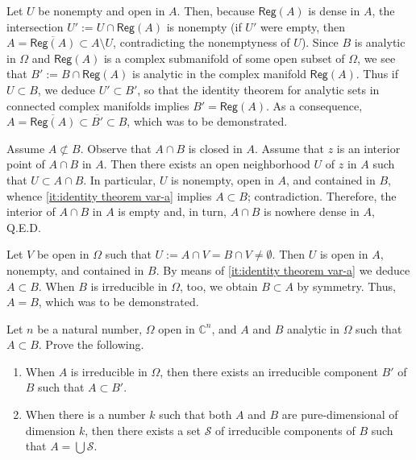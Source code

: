 \documentclass[a4paper]{amsart}
\newcommand{\C}{\mathbb{C}}
\newcommand{\Reg}[1]{\mathsf{Reg}(#1)}
\theoremstyle{remark}
\numberwithin{equation}{question}
\begin{document}
\begin{solution}
\begin{solenum}
\item Let $U$ be nonempty and open in $A$. Then, because $\Reg A$ is dense in $A$, the intersection $U' := U \cap \Reg A$ is nonempty (if $U'$ were empty, then $A = \overline{\Reg A} \subset A \setminus U$, contradicting the nonemptyness of $U$). Since $B$ is analytic in $\Omega$ and $\Reg A$ is a complex submanifold of some open subset of $\Omega$, we see that $B' := B \cap \Reg A$ is analytic in the complex manifold $\Reg A$. Thus if $U \subset B$, we deduce $U' \subset B'$, so that the identity theorem for analytic sets in connected complex manifolds implies $B' = \Reg A$. As a consequence, $A = \overline{\Reg A} \subset \overline{B'} \subset B$, which was to be demonstrated.

\item Assume $A \not\subset B$. Observe that $A \cap B$ is closed in $A$. Assume that $z$ is an interior point of $A \cap B$ in $A$. Then there exists an open neighborhood $U$ of $z$ in $A$ such that $U \subset A \cap B$. In particular, $U$ is nonempty, open in $A$, and contained in $B$, whence \cref{it:identity theorem var-a} implies $A \subset B$; contradiction. Therefore, the interior of $A \cap B$ in $A$ is empty and, in turn, $A \cap B$ is nowhere dense in $A$, Q.E.D.

\item Let $V$ be open in $\Omega$ such that $U := A \cap V = B \cap V \ne \emptyset$. Then $U$ is open in $A$, nonempty, and contained in $B$. By means of \cref{it:identity theorem var-a} we deduce $A \subset B$. When $B$ is irreducible in $\Omega$, too, we obtain $B \subset A$ by symmetry. Thus, $A = B$, which was to be demonstrated.
\end{solenum}
\end{solution}

\begin{question}[subtitle=Irreducible components and subsets]
\label{qu:irred comp subsets}
Let $n$ be a natural number, $\Omega$ open in $\C^n$, and $A$ and $B$ analytic in $\Omega$ such that $A \subset B$. Prove the following.
\begin{enumerate}
\item\label{it:irred comp subsets-a} When $A$ is irreducible in $\Omega$, then there exists an irreducible component $B'$ of $B$ such that $A \subset B'$.
\item When there is a number $k$ such that both $A$ and $B$ are pure-dimensional of dimension $k$, then there exists a set $\mathcal S$ of irreducible components of $B$ such that $A = \bigcup\mathcal S$.
\end{enumerate}
\end{question}
\end{document}
